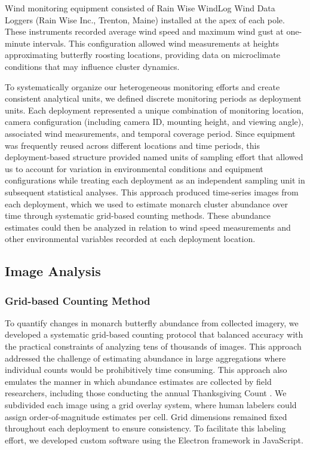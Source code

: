 Wind monitoring equipment consisted of Rain Wise WindLog Wind Data Loggers (Rain Wise Inc., Trenton, Maine) installed at the apex of each pole. These instruments recorded average wind speed and maximum wind gust at one-minute intervals. This configuration allowed wind measurements at heights approximating butterfly roosting locations, providing data on microclimate conditions that may influence cluster dynamics.

To systematically organize our heterogeneous monitoring efforts and create consistent analytical units, we defined discrete monitoring periods as deployment units. Each deployment represented a unique combination of monitoring location, camera configuration (including camera ID, mounting height, and viewing angle), associated wind measurements, and temporal coverage period. Since equipment was frequently reused across different locations and time periods, this deployment-based structure provided named units of sampling effort that allowed us to account for variation in environmental conditions and equipment configurations while treating each deployment as an independent sampling unit in subsequent statistical analyses. This approach produced time-series images from each deployment, which we used to estimate monarch cluster abundance over time through systematic grid-based counting methods. These abundance estimates could then be analyzed in relation to wind speed measurements and other environmental variables recorded at each deployment location.


\subsection{Image Analysis}

\subsubsection{Grid-based Counting Method}

To quantify changes in monarch butterfly abundance from collected imagery, we developed a systematic grid-based counting protocol that balanced accuracy with the practical constraints of analyzing tens of thousands of images. This approach addressed the challenge of estimating abundance in large aggregations where individual counts would be prohibitively time consuming. This approach also emulates the manner in which abundance estimates are collected by field researchers, including those conducting the annual Thanksgiving Count \autocite{xercesProtocolsWesternMonarch2017}. We subdivided each image using a grid overlay system, where human labelers could assign order-of-magnitude estimates per cell. Grid dimensions remained fixed throughout each deployment to ensure consistency. To facilitate this labeling effort, we developed custom software using the Electron framework in JavaScript.

